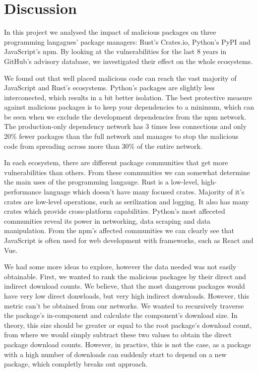 \documentclass[9pt,twocolumn,twoside]{pnas-report}
\begin{document}
\section*{Discussion}

In this project we analysed the impact of malicious packages on three programming langagues' package managers:
Rust's Crates.io, Python's PyPI and JavaScript's npm.
By looking at the vulnerabilities for the last 8 years in GitHub's advisory database, we investigated their effect on the whole ecosystems.

We found out that well placed malicious code can reach the vast majority of JavaScript and Rust's ecosystems.
Python's packages are slightly less interconected, which results in a bit better isolation.
The best protective measure against malicious packages is to keep your dependencies to a minimum, which can be seen when we exclude the development dependencies from the npm network.
The production-only dependency network has 3 times less connections and only 20\% fewer packages than the full network and manages to stop the malicious code from spreading across more than 30\% of the entire network.

In each ecosystem, there are different package communities that get more vulnerabilities than others.
From these communities we can somewhat determine the main uses of the programming langauge.
Rust is a low-level, high-performance language which doesn't have many focused crates.
Majority of it's crates are low-level operations, such as serilization and logging.
It also has many crates which provide cross-platform capabilities.
Python's most affeceted communities reveal its power in networking, data scraping and data manipulation.
From the npm's affected communities we can clearly see that JavaScript is often used for web development with frameworks, such as React and Vue.

We had some more ideas to explore, however the data needed was not easily obtainable.
First, we wanted to rank the malicious packages by their direct and indirect download counts.
We believe, that the most dangerous packages would have very low direct donwloads, but very high indirect downloads.
However, this metric can't be obtained from our networks.
We wanted to recursively traverse the package's in-component and calculate the component's download size.
In theory, this size should be greater or equal to the root package's download count, from where we would simply subtract these two values to obtain the direct package download counts.
However, in practice, this is not the case, as a package with a high number of downloads can suddenly start to depend on a new package, which completly breaks out approach.
\end{document}
